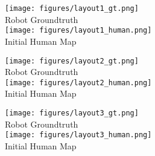 \begin{minipage}{0.32\textwidth}
    \begin{tcolorbox}[colback=gray!5, colframe=black!80, boxrule=0.5mm, 
        sharp corners,  
        title={
            \centering
            \textbf{Demo Layout (Seed: 234)} \\
            \small Similarity: $0.860$ 
        }, width=\textwidth]
        \centering
        \texttt{[image: figures/layout1\_gt.png]}
        \\
        \small Robot Groundtruth
        \\[1em]
        \texttt{[image: figures/layout1\_human.png]}
        \\
        \small Initial Human Map
    \end{tcolorbox}
\end{minipage}
\hfill
\begin{minipage}{0.32\textwidth}
    \begin{tcolorbox}[colback=gray!5, colframe=black!80, boxrule=0.5mm, 
        sharp corners,
        title={
            \centering
            \textbf{Layout 1 (Seed: 666)} \\
            \small Similarity: $0.843$ 
        },
        width=\textwidth]
        \centering
        \texttt{[image: figures/layout2\_gt.png]}
        \\
        \small Robot Groundtruth
        \\[1em]
        \texttt{[image: figures/layout2\_human.png]}
        \\
        \small Initial Human Map
    \end{tcolorbox}
\end{minipage}
\hfill
\begin{minipage}{0.32\textwidth}
    \begin{tcolorbox}[colback=gray!5, colframe=black!80, boxrule=0.5mm, 
    sharp corners,
    title={
            \centering
            \textbf{Layout 2 (Seed: 9)} \\
            \small Similarity: $0.876$ 
        },
        width=\textwidth]
        \centering
        \texttt{[image: figures/layout3\_gt.png]}
        \\
        \small Robot Groundtruth
        \\[1em]
        \texttt{[image: figures/layout3\_human.png]}
        \\
        \small Initial Human Map
    \end{tcolorbox}
\end{minipage}